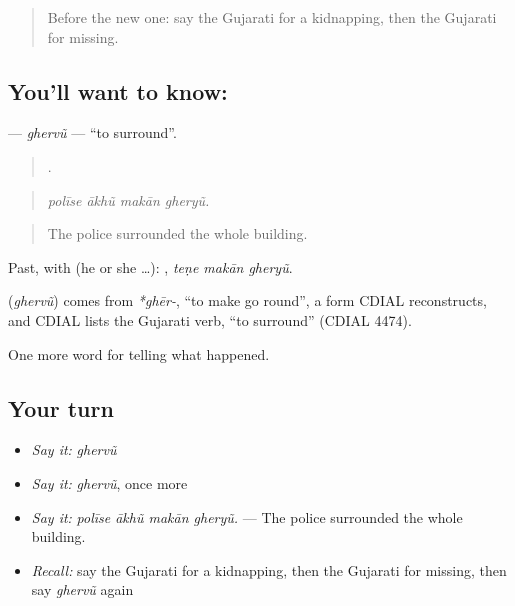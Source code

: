 \begin{quote}
Before the new one: say the Gujarati for a kidnapping, then the Gujarati for missing.
\end{quote}

\subsection*{You'll want to know: }
\textbf{} — \emph{ghervũ} — \textquotedblleft{}to surround\textquotedblright{}.

\begin{quote}
   .
\end{quote}

\begin{quote}
\emph{polīse ākhũ makān gheryũ.}
\end{quote}

\begin{quote}
The police surrounded the whole building.
\end{quote}

Past, with  (he or she …):   , \emph{teṇe makān gheryũ}.

\begin{cousinweb}
\textbf{} (\emph{ghervũ}) comes from \emph{*ghēr-}, \textquotedblleft{}to make go round\textquotedblright{}, a form CDIAL reconstructs, and CDIAL lists the Gujarati verb, \textquotedblleft{}to surround\textquotedblright{} (CDIAL 4474).
\end{cousinweb}

\begin{grammarlens}[title={What you've built}]
One more word for telling what happened.
\end{grammarlens}

\subsection*{Your turn}
\begin{itemize}
\raggedright
  \item \emph{Say it:} \emph{ghervũ}
  \item \emph{Say it:} \emph{ghervũ}, once more
  \item \emph{Say it:} \emph{polīse ākhũ makān gheryũ.} — The police surrounded the whole building.
  \item \emph{Recall:} say the Gujarati for a kidnapping, then the Gujarati for missing, then say \emph{ghervũ} again
\end{itemize}

